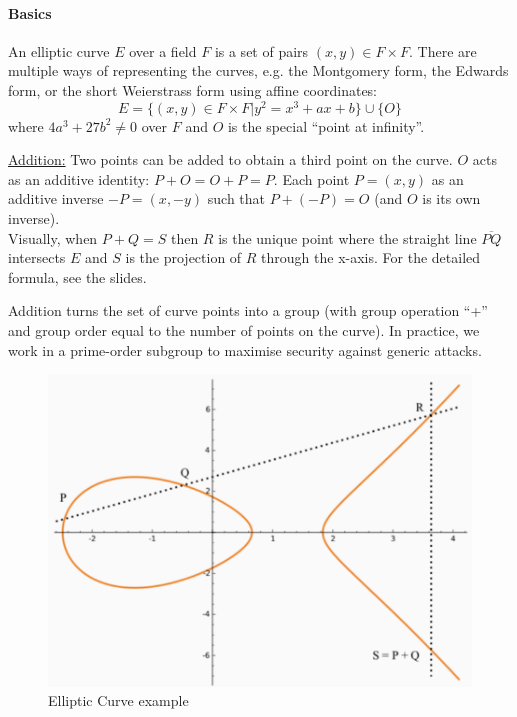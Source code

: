 \paragraph{Basics}
An elliptic curve $E$ over a field $F$ is a set of pairs $(x, y) \in F \times F$.
There are multiple ways of representing the curves, e.g. the Montgomery form,
the Edwards form, or the short Weierstrass form using affine coordinates:
$$ E = \{ (x,y) \in F \times F | y^2 = x^3 + ax + b \} \cup \{ O \} $$
where $4a^3 + 27b^2 \neq 0$ over $F$ and $O$ is the special ``point at infinity''.

\underline{Addition:}
Two points can be added to obtain a third point on the curve.
$O$ acts as an additive identity: $P+O=O+P=P$.
Each point $P=(x,y)$ as an additive inverse $-P=(x,-y)$ such that $P + (-P) = O$ (and $O$ is its own inverse).
\\
Visually, when $P+Q=S$ then $R$ is the unique point where the straight line
$\overline{PQ}$ intersects $E$ and $S$ is the projection of $R$ through the x-axis.
For the detailed formula, see the slides.

Addition turns the set of curve points into a group (with group operation ``+''
and group order equal to the number of points on the curve).
In practice, we work in a prime-order subgroup to maximise security against generic attacks.

\begin{figure}[h]
    \centering
	\includegraphics[scale=0.35]{images/ec-addition.png}
    \caption{Elliptic Curve example}
    \label{fig:ec-addition}
\end{figure}

